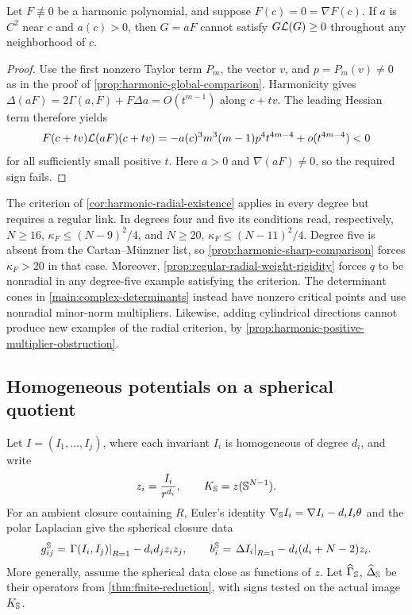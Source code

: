 \begin{proposition}
\label{prop:harmonic-positive-multiplier-obstruction}
\label{rem:harmonic-radial-singular-obstruction}
Let \(F\not\equiv0\) be a harmonic polynomial, and suppose
\(F(c)=0=\nabla F(c)\). If \(a\) is \(C^2\) near \(c\) and
\(a(c)>0\), then \(G=aF\) cannot satisfy \(G\mathcal L(G)\ge0\)
throughout any neighborhood of \(c\).
\end{proposition}

\begin{proof}
Use the first nonzero Taylor term \(P_m\), the vector \(v\), and
\(p=P_m(v)\ne0\) as in the proof of
\cref{prop:harmonic-global-comparison}. Harmonicity gives
\(\Delta(aF)=2\Gamma(a,F)+F\Delta a=O(t^{m-1})\) along
\(c+tv\). The leading Hessian term therefore yields
\[
 F(c+tv)\mathcal L(aF)(c+tv)
 =-a(c)^3m^3(m-1)p^4t^{4m-4}+o(t^{4m-4})<0
\]
for all sufficiently small positive \(t\). Here \(a>0\) and
\(\nabla(aF)\ne0\), so the required sign fails.
\end{proof}

\begin{remark}
\label{rem:higher-degree-radial-scope}
The criterion of \cref{cor:harmonic-radial-existence} applies in every
degree but requires a regular link. In degrees four and five its
conditions read, respectively, \(N\ge16\),
\(\kappa_F\le(N-9)^2/4\), and \(N\ge20\),
\(\kappa_F\le(N-11)^2/4\). Degree five is absent from the
Cartan--M\"unzner list, so \cref{prop:harmonic-sharp-comparison}
forces \(\kappa_F>20\) in that case.
Moreover, \cref{prop:regular-radial-weight-rigidity} forces \(q\)
to be nonradial in any degree-five example satisfying the criterion.
The determinant cones in \cref{main:complex-determinants} instead
have nonzero critical points and use nonradial minor-norm multipliers.
Likewise, adding cylindrical directions cannot produce new examples
of the radial criterion, by
\cref{prop:harmonic-positive-multiplier-obstruction}.
\end{remark}

\subsection{Homogeneous potentials on a spherical quotient}
\label{sec:spherical-quotient-potentials}

Let \(I=(I_1,\ldots,I_j)\), where each invariant \(I_i\) is
homogeneous of degree \(d_i\), and write
\[
 z_i=\frac{I_i}{r^{d_i}},\qquad
 K_{\mathbb S}=z(\mathbb S^{N-1}).
\]
For an ambient closure containing \(R\), Euler's identity
\(\nabla_{\mathbb S}I_i=\nabla I_i-d_iI_i\theta\) and the polar
Laplacian give the spherical closure data
\begin{equation}\label{eq:spherical-closure-from-ambient}
 g^{\mathbb S}_{ij}=\left.\Gamma(I_i,I_j)\right|_{R=1}-d_id_jz_iz_j,
 \qquad
 b^{\mathbb S}_i=\left.\Delta I_i\right|_{R=1}
              -d_i(d_i+N-2)z_i.
\end{equation}
More generally, assume the spherical data close as functions of \(z\).
Let \(\widehat\Gamma_{\mathbb S}\), \(\widehat\Delta_{\mathbb S}\) be their
operators from \cref{thm:finite-reduction}, with signs tested on
the actual image \(K_{\mathbb S}\).

